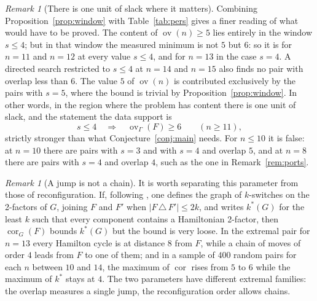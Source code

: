 \documentclass[11pt,a4paper]{article}
\theoremstyle{definition}
\theoremstyle{remark}
\newtheorem{remark}[theorem]{Remark}
\newcommand{\ov}{\operatorname{ov}}
\newcommand{\cor}{\operatorname{cor}}
\begin{document}
\begin{remark}[There is one unit of slack where it matters]\label{rem:slack}
Combining Proposition~\ref{prop:window} with Table~\ref{tab:pers} gives a finer reading of what would have to be proved. The content of $\ov(n)\ge5$ lies entirely in the window $s\le4$; but in that window the measured minimum is not $5$ but $6$: so it is for $n=11$ and $n=12$ at every value $s\le4$, and for $n=13$ in the case $s=4$. A directed search restricted to $s\le4$ at $n=14$ and $n=15$ also finds no pair with overlap less than $6$. The value $5$ of $\ov(n)$ is contributed exclusively by the pairs with $s=5$, where the bound is trivial by Proposition~\ref{prop:window}. In other words, in the region where the problem has content there is one unit of slack, and the statement the data support is
\[
s\le4 \quad\Longrightarrow\quad \ov_\Gamma(F)\ge 6\qquad(n\ge11),
\]
strictly stronger than what Conjecture~\ref{conj:main} needs. For $n\le10$ it is false: at $n=10$ there are pairs with $s=3$ and with $s=4$ and overlap $5$, and at $n=8$ there are pairs with $s=4$ and overlap $4$, such as the one in Remark~\ref{rem:ports}.
\end{remark}

\begin{remark}[A jump is not a chain]\label{rem:separation}
It is worth separating this parameter from those of reconfiguration. If, following \cite{kps}, one defines the graph of $k$-switches on the 2-factors of $G$, joining $F$ and $F'$ when $|F\,\triangle\,F'|\le2k$, and writes $k^*(G)$ for the least $k$ such that every component contains a Hamiltonian 2-factor, then $\cor_G(F)$ bounds $k^*(G)$ but the bound is very loose. In the extremal pair for $n=13$ every Hamilton cycle is at distance $8$ from $F$, while a chain of moves of order $4$ leads from $F$ to one of them; and in a sample of $400$ random pairs for each $n$ between $10$ and $14$, the maximum of $\cor$ rises from $5$ to $6$ while the maximum of $k^*$ stays at $4$. The two parameters have different extremal families: the overlap measures a single jump, the reconfiguration order allows chains.
\end{remark}
\end{document}
